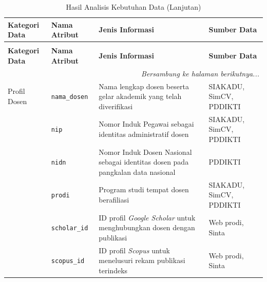 \documentclass{rapidsart}
\theoremstyle{plain}
\theoremstyle{remark}
\theoremstyle{definition}
\begin{document}
\begin{sloppypar}
    \begingroup
    \small
    \renewcommand{\arraystretch}{1.2}
    \begin{longtable}{ll>{\raggedright\arraybackslash}p{}>{\raggedright\arraybackslash}p{}}
        \caption{Hasil Analisis Kebutuhan Data} \label{tab:deskripsi-dataset}                                                                                            \\
        \toprule
        \textbf{Kategori Data} & \textbf{Nama Atribut}   & \textbf{Jenis Informasi}                                                         & \textbf{Sumber Data}       \\
        \midrule
        \endfirsthead
        \caption[]{Hasil Analisis Kebutuhan Data (Lanjutan)}                                                                                                             \\
        \toprule
        \textbf{Kategori Data} & \textbf{Nama Atribut}   & \textbf{Jenis Informasi}                                                         & \textbf{Sumber Data}       \\
        \midrule
        \endhead
        \midrule
        \multicolumn{4}{r}{\textit{Bersambung ke halaman berikutnya...}}                                                                                                 \\
        \endfoot
        \bottomrule
        \endlastfoot
        Profil Dosen           & \texttt{nama\_dosen}    & Nama lengkap dosen beserta gelar akademik yang telah diverifikasi                & SIAKADU, SimCV, PDDIKTI    \\
                               & \texttt{nip}            & Nomor Induk Pegawai sebagai identitas administratif dosen                        & SIAKADU, SimCV, PDDIKTI    \\
                               & \texttt{nidn}           & Nomor Induk Dosen Nasional sebagai identitas dosen pada pangkalan data nasional  & PDDIKTI                    \\
                               & \texttt{prodi}          & Program studi tempat dosen berafiliasi                                           & SIAKADU, SimCV, PDDIKTI    \\
                               & \texttt{scholar\_id}    & ID profil \textit{Google Scholar} untuk menghubungkan dosen dengan publikasi     & Web prodi, Sinta           \\
                               & \texttt{scopus\_id}     & ID profil \textit{Scopus} untuk menelusuri rekam publikasi terindeks             & Web prodi, Sinta           \\

\end{longtable}
\end{sloppypar}
\end{document}
